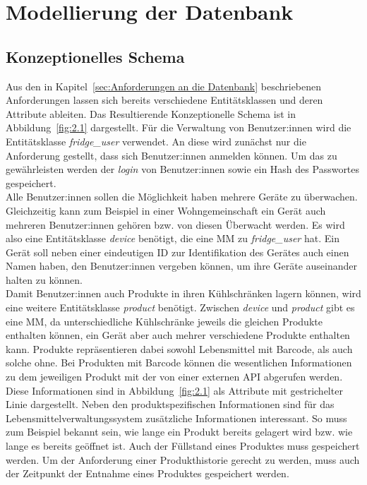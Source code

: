 \chapter{Modellierung der Datenbank}\label{ch:Modellierung der Datenbank}
\section{Konzeptionelles Schema}\label{sec:Konzeptionelles Schema}

Aus den in Kapitel~\ref{sec:Anforderungen an die Datenbank} beschriebenen Anforderungen lassen sich bereits verschiedene Entitätsklassen und deren Attribute ableiten. Das Resultierende Konzeptionelle Schema ist in Abbildung~\ref{fig:2.1} dargestellt. Für die Verwaltung von Benutzer:innen wird die Entitätsklasse \textit{fridge\_user} verwendet. An diese wird zunächst nur die Anforderung gestellt, dass sich Benutzer:innen anmelden können. Um das zu gewährleisten werden der \textit{login} von Benutzer:innen sowie ein \Gls{Hash} des Passwortes gespeichert.\\ Alle Benutzer:innen sollen die Möglichkeit haben mehrere Geräte zu überwachen. Gleichzeitig kann zum Beispiel in einer Wohngemeinschaft ein Gerät auch mehreren Benutzer:innen gehören bzw. von diesen Überwacht werden. Es wird also eine Entitätsklasse \textit{device} benötigt, die eine \Gls{MM} zu \textit{fridge\_user} hat. Ein Gerät soll neben einer eindeutigen ID zur Identifikation des Gerätes auch einen Namen haben, den Benutzer:innen vergeben können, um ihre Geräte auseinander halten zu können.\\ Damit Benutzer:innen auch Produkte in ihren Kühlschränken lagern können, wird eine weitere Entitätsklasse \textit{product} benötigt. Zwischen \textit{device} und \textit{product} gibt es eine \Gls{MM}, da unterschiedliche Kühlschränke jeweils die gleichen Produkte enthalten können, ein Gerät aber auch mehrer verschiedene Produkte enthalten kann. Produkte repräsentieren dabei sowohl Lebensmittel mit Barcode, als auch solche ohne. Bei Produkten mit Barcode können die wesentlichen Informationen zu dem jeweiligen Produkt mit der  von einer externen \gls{API} abgerufen werden. Diese Informationen sind in Abbildung~\ref{fig:2.1} als Attribute mit gestrichelter Linie dargestellt. Neben den produktspezifischen Informationen sind für das Lebensmittelverwaltungssystem zusätzliche Informationen interessant. So muss zum Beispiel bekannt sein, wie lange ein Produkt bereits gelagert wird bzw. wie lange es bereits geöffnet ist. Auch der Füllstand eines Produktes muss gespeichert werden. Um der Anforderung einer Produkthistorie gerecht zu werden, muss auch der Zeitpunkt der Entnahme eines Produktes gespeichert werden.

